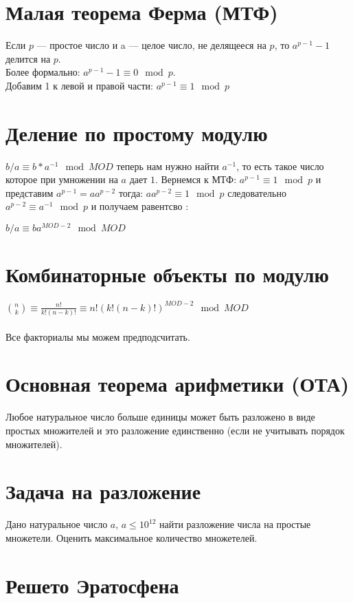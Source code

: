 \documentclass[10pt]{article}
\begin{document}
    \section{Малая теорема Ферма (МТФ)}
    Если $p$ — простое число и a — целое число, не делящееся на $p$, то $a^{p-1}-1$ делится на $p$.
    \\
    Более формально: $a^{p - 1} - 1 \equiv 0 \mod p$.
    \\
    Добавим 1 к левой и правой части: $a^{p - 1} \equiv 1 \mod p$
    
    \section{Деление по простому модулю}
    $b / a  \equiv b * a ^ {-1} \mod MOD$
    теперь нам нужно найти $a^{-1}$, то есть такое число которое при умножении на $a$ дает $1$.
    Вернемся к МТФ: $a^{p - 1} \equiv 1 \mod p$ и представим $a^{p - 1} = aa^{p - 2}$ тогда:
    $aa^{p - 2} \equiv 1 \mod p$ следовательно $a^{p-2} \equiv a^{-1} \mod p $
    и получаем равентсво : 
    
    \begin{center}
        \Large
        $b / a \equiv ba^{MOD - 2} \mod MOD $
        \normalsize
    \end{center}
    
    \section{Комбинаторные объекты по модулю}
    $\binom{n}{k} \equiv \frac{n!}{k!(n-k)!} \equiv n!(k!(n-k)!)^{MOD-2} \mod MOD$ 
    \\
    \\
    Все факториалы мы можем предподсчитать.
    
    \section{Основная теорема арифметики (ОТА)}
    Любое натуральное число больше единицы может быть разложено в виде простых множителей и это разложение единственно (если не учитывать порядок множителей).
    \section{Задача на разложение}
    Дано натуральное число $a$, $a  \leq 10^{12}$ найти разложение числа на простые множетели.
    Оценить максимальное количество множетелей.
    \section{Решето Эратосфена}
    
\end{document}
